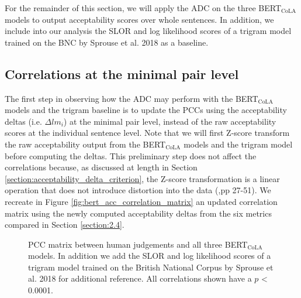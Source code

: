 For the remainder of this section, we will apply the ADC on the three BERT$_\mathrm{CoLA}$ models to output acceptability scores over whole sentences.  In addition, we include into our analysis the SLOR and log likelihood scores of a trigram model trained on the BNC by Sprouse et al. 2018 as a baseline.

\subsection{Correlations at the minimal pair level}
\label{section:2.5.1}
The first step in observing how the ADC may perform with the BERT$_\mathrm{CoLA}$ models and the trigram baseline is to update the PCCs using the acceptability deltas (i.e. $\Delta lm_i$) at the minimal pair level, instead of the raw acceptability scores at the individual sentence level.  Note that we will first Z-score transform the raw acceptability output from the BERT$_\mathrm{CoLA}$ models and the trigram model before computing the deltas.  This preliminary step does not affect the correlations because, as discussed at length in Section \ref{section:acceptability_delta_criterion}, the Z-score transformation is a linear operation that does not introduce distortion into the data (\citealp{schutze},pp 27-51).  We recreate in Figure \ref{fig:bert_acc_correlation_matrix} an updated correlation matrix using the newly computed acceptability deltas from the six metrics compared in Section \ref{section:2.4}.


\begin{figure}[h]
    \caption[PCC matrix between human judgements, BERT$_\mathrm{CoLA}$, \newline and a trigram model]{PCC matrix between human judgements and all three BERT$_\mathrm{CoLA}$ models.  In addition we add the SLOR and log likelihood scores of a trigram model trained on the British National Corpus by Sprouse et al. 2018 for additional reference.  All correlations shown have a $p$ < 0.0001.}
    \label{fig:bert_acc_delta_correlation_matrix}
\end{figure}

